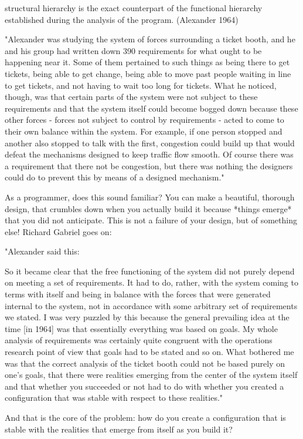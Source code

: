 	structural hierarchy is the exact counterpart of the functional hierarchy established during the analysis of the program. (Alexander 1964)

"Alexander was studying the system of forces surrounding a ticket booth, and he and his group had written down 390 requirements for what ought to be happening near it. Some of them pertained to such things as being there to get tickets, being able to get change, being able to move past people waiting in line to get tickets, and not having to wait too long for tickets. What he noticed, though, was that certain parts of the system were not subject to these requirements and that the system itself could become bogged down because these other forces - forces not subject to control by requirements - acted to come to their own balance within the system. For example, if one person stopped and another also stopped to talk with the first, congestion could build up that would defeat the mechanisms designed to keep traffic flow smooth. Of course there was a requirement that there not be congestion, but there was nothing the designers could do to prevent this by means of a designed mechanism."

As a programmer, does this sound familiar?  You can make a beautiful, thorough design, that crumbles down when you actually build it because *things emerge* that you did not anticipate.  This is not a failure of your design, but of something else!  Richard Gabriel goes on:

"Alexander said this:

	So it became clear that the free functioning of the system did not purely depend on meeting a set of requirements. It had to do, rather, with the system coming to terms with itself and being in balance with the forces that were generated internal to the system, not in accordance with some arbitrary set of requirements we stated. I was very puzzled by this because the general prevailing idea at the time [in 1964] was that essentially everything was based on goals. My whole analysis of requirements was certainly quite congruent with the operations research point of view that goals had to be stated and so on.  What bothered me was that the correct analysis of the ticket booth could not be based purely on one’s goals, that there were realities emerging from the center of the system itself and that whether you succeeded or not had to do with whether you created a configuration that was stable with respect to these realities."

And that is the core of the problem:  how do you create a configuration that is stable with the realities that emerge from itself as you build it?


